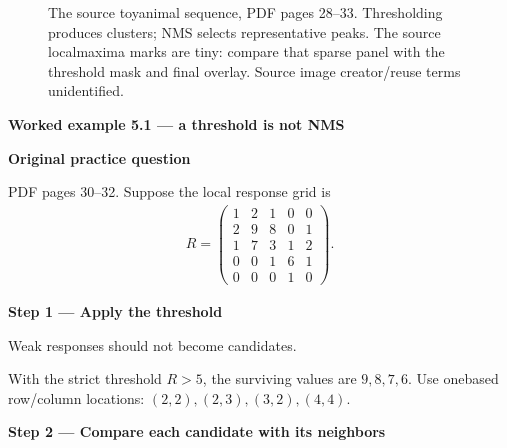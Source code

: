 \documentclass[letterpaper,11pt,english,openany,oneside]{jupyterBook}
\begin{document}
\begin{figure}[H]
\centering
\capstart

\noindent{}
\caption{The source toy\sphinxhyphen{}animal sequence, PDF pages 28–33. Thresholding produces clusters; NMS selects representative peaks. The source local\sphinxhyphen{}maxima marks are tiny: compare that sparse panel with the threshold mask and final overlay. Source image creator/reuse terms unidentified.}\label{\detokenize{lectures/lecture05/corners:fig-lec05-harris-stages}}\end{figure}
\label{\detokenize{lectures/lecture05/corners:ex-lec05-nms}}
\begin{TextbookBox}
\textbf{Worked example 5.1 — a threshold is not NMS}\par\smallskip

\par\medskip\textbf{Original practice question}\par\smallskip

\sphinxAtStartPar
{} PDF pages 30–32. Suppose the local response grid is
\begin{equation*}
\begin{split}R=\begin{pmatrix}1&2&1&0&0\\2&9&8&0&1\\1&7&3&1&2\\0&0&1&6&1\\0&0&0&1&0\end{pmatrix}.\end{split}
\end{equation*}
\par\medskip

\par\medskip{}
{\color{QuizStepRed}\bfseries Step 1 — Apply the threshold}\par\smallskip

\sphinxAtStartPar
{} Weak responses should not become candidates.

\sphinxAtStartPar
With the strict threshold {\color{QuizMathBlue} \(R>5\)}, the surviving values are {\color{QuizMathBlue} \(9,8,7,6\)}. Use one\sphinxhyphen{}based row/column locations: {\color{QuizMathBlue} \((2,2),(2,3),(3,2),(4,4)\)}.

\par

\par\medskip{}
{\color{QuizStepRed}\bfseries Step 2 — Compare each candidate with its neighbors}\par\smallskip


\end{TextbookBox}
\end{document}

